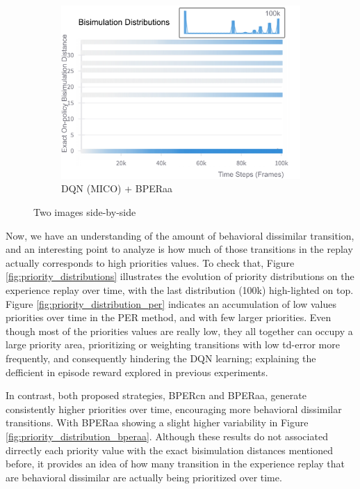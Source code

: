 \begin{figure}[h]
\begin{subfigure}{0.32\textwidth}
        \includegraphics[width=\linewidth]{Results/grid_world/exact_bisimulation_dqn_mico_bperaa.png}
        \caption{DQN (MICO) + BPERaa}
        \label{fig:exact_bisim_bperaa}
    \end{subfigure}
    \caption{Two images side-by-side}
    \label{fig:exact_bisimulation_distributions}
\end{figure}

Now, we have an understanding of the amount of behavioral dissimilar transition, and an interesting point to analyze is how much of those transitions in the replay actually corresponds to high priorities values. To check that, Figure \ref{fig:priority_distributions} illustrates the evolution of priority distributions on the experience replay over time, with the last distribution (100k) high-lighted on top. Figure \ref{fig:priority_distribution_per} indicates an accumulation of low values priorities over time in the PER method, and with few larger priorities. Even though most of the priorities values are really low, they all together can occupy a large priority area, prioritizing or weighting transitions with low td-error more frequently, and consequently hindering the DQN learning; explaining the defficient in episode reward explored in previous experiments.

In contrast, both proposed strategies, BPERcn and BPERaa, generate consistently higher priorities over time, encouraging more behavioral dissimilar transitions. With BPERaa showing a slight higher variability in Figure \ref{fig:priority_distribution_bperaa}. Although these results do not associated dirrectly each priority value with the exact bisimulation distances mentioned before, it provides an idea of how many transition in the experience replay that are behavioral dissimilar are actually being prioritized over time.

